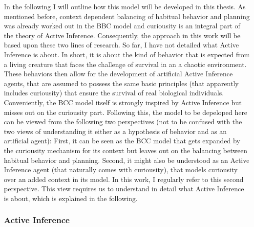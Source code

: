 In the following I will outline how this model will be developed in this thesis. As mentioned before, context dependent balancing of habitual behavior and planning was already worked out in the BBC model and curiousity is an integral part of the theory of Active Inference. Consequently, the approach in this work will be based upon these two lines of research. So far, I have not detailed what Active Inference is about. In short, it is about the kind of behavior that is expected from a living creature that faces the challenge of survival in an a chaotic environment. These behaviors then allow for the development of artificial Active Inference agents, that are assumed to possess the same basic principles (that apparently includes curiousity) that ensure the survival of real biological individuals. Conveniently, the BCC model itself is strongly inspired by Active Inference but misses out on the curiousity part. Following this, the model to be depeloped here can be viewed from the following two perspectives (not to be confused with the two views of understanding it either as a hypothesis of behavior and as an artificial agent): First, it can be seen as the BCC model that gets expanded by the curiousity mechanism for its context but leaves out on the balancing between habitual behavior and planning. Second, it might also be understood as an Active Inference agent (that naturally comes with curiousity), that models curiousity over an added context in its model. In this work, I regularly refer to this second perspective. This view requires us to understand in detail what Active Inference is about, which is explained in the following.

\subsubsection{Active Inference}

